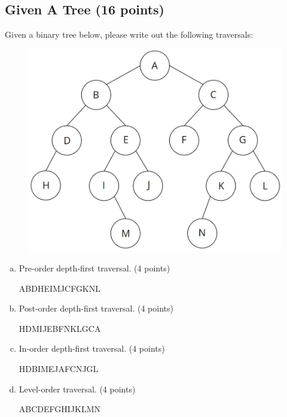 \documentclass[11pt]{exam}
\begin{document}
\subsection{Given A Tree (16 points)}
Given a binary tree below, please write out the following traversals:
\begin{figure}[H]
\centering
\includegraphics[width=.5\linewidth]{binary_tree.png}
\end{figure}
\begin{enumerate}[(a)]
\item Pre-order depth-first traversal. (4 points)
\begin{solution}
ABDHEIMJCFGKNL
\end{solution}

\item Post-order depth-first traversal. (4 points)
\begin{solution}
HDMIJEBFNKLGCA
\end{solution}

\item In-order depth-first traversal. (4 points)
\begin{solution}
HDBIMEJAFCNJGL
\end{solution}

\item Level-order traversal. (4 points)
\begin{solution}
ABCDEFGHIJKLMN
\end{solution}

\end{enumerate}
\end{document}
